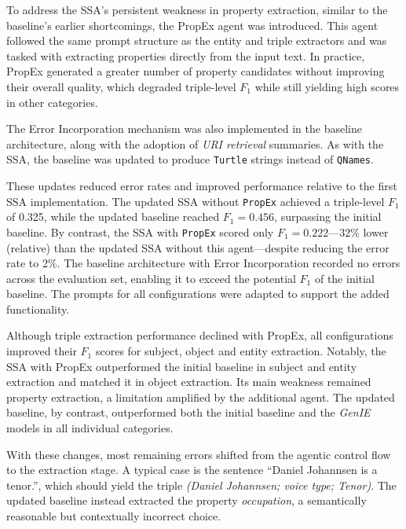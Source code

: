 \documentclass[a4paper,oneside,bibliography=totoc]{scrbook}
\begin{document}
To address the \ac{SSA}’s persistent weakness in property extraction, similar to the baseline’s earlier shortcomings, the \ac{PropEx} agent was introduced. This agent followed the same prompt structure as the entity and triple extractors and was tasked with extracting properties directly from the input text. In practice, \ac{PropEx} generated a greater number of property candidates without improving their overall quality, which degraded triple-level $F_{1}$ while still yielding high scores in other categories.

The Error Incorporation mechanism was also implemented in the baseline architecture, along with the adoption of \textit{URI retrieval} summaries. As with the \ac{SSA}, the baseline was updated to produce \texttt{Turtle} strings instead of \texttt{QNames}.

These updates reduced error rates and improved performance relative to the first \ac{SSA} implementation. The updated \ac{SSA} without \texttt{PropEx} achieved a triple-level $F_{1}$ of 0.325, while the updated baseline reached $F_{1}=0.456$, surpassing the initial baseline. By contrast, the \ac{SSA} with \texttt{PropEx} scored only $F_{1}=0.222$—32\% lower (relative) than the updated \ac{SSA} without this agent—despite reducing the error rate to 2\%. The baseline architecture with Error Incorporation recorded no errors across the evaluation set, enabling it to exceed the potential $F_{1}$ of the initial baseline. The prompts for all configurations were adapted to support the added functionality.

Although triple extraction performance declined with \ac{PropEx}, all configurations improved their $F_{1}$ scores for subject, object and entity extraction. Notably, the \ac{SSA} with \ac{PropEx} outperformed the initial baseline in subject and entity extraction and matched it in object extraction. Its main weakness remained property extraction, a limitation amplified by the additional agent. The updated baseline, by contrast, outperformed both the initial baseline and the \textit{GenIE} models in all individual categories.

With these changes, most remaining errors shifted from the agentic control flow to the extraction stage. A typical case is the sentence \enquote{Daniel Johannsen is a tenor.}, which should yield the triple \textit{(Daniel Johannsen; voice type; Tenor)}. The updated baseline instead extracted the property \textit{occupation}, a semantically reasonable but contextually incorrect choice.
\end{document}
